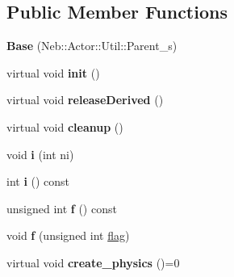 \subsection*{Public Member Functions}
\begin{DoxyCompactItemize}
\item 
\hypertarget{classNeb_1_1Actor_1_1Base_a2148b7903d9aebf73bcb333240e8a5ac}{{\bfseries Base} (Neb\-::\-Actor\-::\-Util\-::\-Parent\-\_\-s)}\label{classNeb_1_1Actor_1_1Base_a2148b7903d9aebf73bcb333240e8a5ac}

\item 
\hypertarget{classNeb_1_1Actor_1_1Base_aea161083c16227392cc4556928f5479e}{virtual void {\bfseries init} ()}\label{classNeb_1_1Actor_1_1Base_aea161083c16227392cc4556928f5479e}

\item 
\hypertarget{classNeb_1_1Actor_1_1Base_a6fcf7946643de0bdda7ef31b089ecd7a}{virtual void {\bfseries release\-Derived} ()}\label{classNeb_1_1Actor_1_1Base_a6fcf7946643de0bdda7ef31b089ecd7a}

\item 
\hypertarget{classNeb_1_1Actor_1_1Base_a2368293ffeb3a2bee634a6b361171705}{virtual void {\bfseries cleanup} ()}\label{classNeb_1_1Actor_1_1Base_a2368293ffeb3a2bee634a6b361171705}

\item 
\hypertarget{classNeb_1_1Actor_1_1Base_a732e42c211856137d5fa55d041606805}{void {\bfseries i} (int ni)}\label{classNeb_1_1Actor_1_1Base_a732e42c211856137d5fa55d041606805}

\item 
\hypertarget{classNeb_1_1Actor_1_1Base_a8b8facad0502a876dec354116069fc00}{int {\bfseries i} () const }\label{classNeb_1_1Actor_1_1Base_a8b8facad0502a876dec354116069fc00}

\item 
\hypertarget{classNeb_1_1Actor_1_1Base_ab093290863fcedd9ef36828de4438401}{unsigned int {\bfseries f} () const }\label{classNeb_1_1Actor_1_1Base_ab093290863fcedd9ef36828de4438401}

\item 
\hypertarget{classNeb_1_1Actor_1_1Base_a400c04ba14166e7e399630c576f626eb}{void {\bfseries f} (unsigned int \hyperlink{structNeb_1_1Actor_1_1Base_1_1flag}{flag})}\label{classNeb_1_1Actor_1_1Base_a400c04ba14166e7e399630c576f626eb}

\item 
\hypertarget{classNeb_1_1Actor_1_1Base_ae5649ec4e6bae0235f5056f8ef877f6e}{virtual void {\bfseries create\-\_\-physics} ()=0}\label{classNeb_1_1Actor_1_1Base_ae5649ec4e6bae0235f5056f8ef877f6e}


\end{DoxyCompactItemize}
